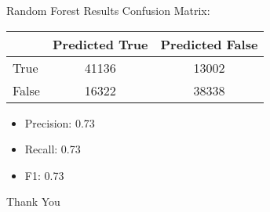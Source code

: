 \documentclass[10pt,t]{beamer}
\newcommand{\bi}{\begin{itemize}}                                 %
\newcommand{\ei}{\end{itemize}}                                   %
\begin{document}
\begin{frame}[c]{Random Forest Results}
Confusion Matrix:

\begin{table}
	\begin{tabular}{l | c | c }
		& Predicted True & Predicted False\\
		\hline \hline
		True & 41136 & 13002\\ 
		False & 16322 & 38338
	\end{tabular}
\end{table}
\bi
	\item Precision: 0.73
	\item Recall: 0.73
	\item F1: 0.73
\ei
\end{frame}

\begin{frame}[fragile, c]  %
	\begin{center}
		\Large{Thank You}
	\end{center}
\end{frame}
\end{document}

